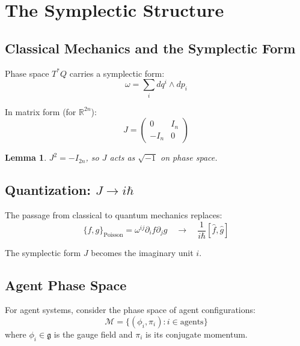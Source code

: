 \documentclass[11pt,a4paper]{article}
\newtheorem{lemma}[theorem]{Lemma}
\newcommand{\R}{\mathbb{R}}
\begin{document}
\section{The Symplectic Structure}

\subsection{Classical Mechanics and the Symplectic Form}

Phase space $T^*Q$ carries a symplectic form:
\begin{equation}
    \omega = \sum_i dq^i \wedge dp_i
\end{equation}

In matrix form (for $\R^{2n}$):
\begin{equation}
    J = \begin{pmatrix} 0 & I_n \\ -I_n & 0 \end{pmatrix}
\end{equation}

\begin{lemma}
$J^2 = -I_{2n}$, so $J$ acts as $\sqrt{-1}$ on phase space.
\end{lemma}

\subsection{Quantization: $J \to i\hbar$}

The passage from classical to quantum mechanics replaces:
\begin{equation}
    \{f, g\}_{\text{Poisson}} = \omega^{ij} \partial_i f \partial_j g \quad \longrightarrow \quad \frac{1}{i\hbar}[\hat{f}, \hat{g}]
\end{equation}

The symplectic form $J$ becomes the imaginary unit $i$.

\subsection{Agent Phase Space}

For agent systems, consider the phase space of agent configurations:
\begin{equation}
    \mathcal{M} = \{(\phi_i, \pi_i) : i \in \text{agents}\}
\end{equation}
where $\phi_i \in \mathfrak{g}$ is the gauge field and $\pi_i$ is its conjugate momentum.
\end{document}
